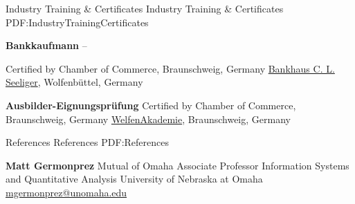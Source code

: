 \documentclass[letterpaper,MMMyyyy,nonstopmode]{simpleresumecv}
\begin{document}
\begin{Body}

\Section
{Industry Training \&\newline
Certificates}
{Industry Training \& Certificates}
{PDF:IndustryTrainingCertificates}

\Entry
\textbf{Bankkaufmann}
\hfill
{} --

\Gap
\BulletItem
Certified by Chamber of Commerce, Braunschweig, Germany
\BulletItem
 \href{https://www.seeligerbank.de/}{Bankhaus C. L. Seeliger}, Wolfenbüttel, Germany


\BigGap
\Entry
\textbf{Ausbilder-Eignungsprüfung} 
\hfill
{}
\Gap
\BulletItem
Certified by Chamber of Commerce, Braunschweig, Germany
\BulletItem
\href{http://en.welfenakademie.de/}{WelfenAkademie}, Braunschweig, Germany














\Section
{References}
{References}
{PDF:References}

\BulletItem
\textbf{Matt Germonprez}
\newline
Mutual of Omaha Associate Professor
\newline
Information Systems and Quantitative Analysis
\newline
University of Nebraska at Omaha
\newline
\href{mailto:mgermonprez@unomaha.edu}
{mgermonprez@unomaha.edu}


\end{Body}
\end{document}
